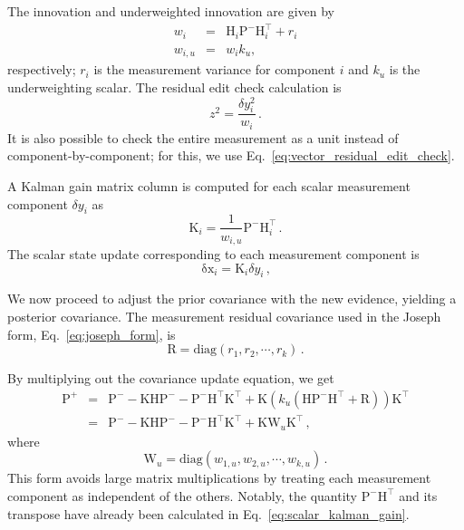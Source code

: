 \documentclass[12pt]{article}
\begin{document}
The innovation and underweighted innovation are given by
\begin{eqnarray}
w_i     &=& \mathrm{H}_i \mathrm{P}^{-} \mathrm{H}_i^\top + r_i \\
w_{i,u} &=& w_i k_u\text{,}
\end{eqnarray}
respectively; $r_i$ is the measurement variance for component $i$ and $k_u$ is the underweighting scalar. The residual edit check calculation is
\begin{equation}
z^2 = \frac{\delta y_i^2}{w_i}\,\text{.}
\end{equation}
It is also possible to check the entire measurement as a unit instead of component-by-component; for this, we use Eq.~\ref{eq:vector_residual_edit_check}.

A Kalman gain matrix column is computed for each scalar measurement component $\delta y_i$ as
\begin{equation}
\mathrm{K}_i = \frac{1}{w_{i,u}} \mathrm{P}^{-}\mathrm{H}_i^\top\,\text{.}\label{eq:scalar_kalman_gain}
\end{equation}
The scalar state update corresponding to each measurement component is
\begin{equation}
\mathrm{\delta x}_i = \mathrm{K}_i \delta y_i\,\text{,}
\end{equation}

We now proceed to adjust the prior covariance with the new evidence, yielding a posterior covariance. The measurement residual covariance used in the Joseph form, Eq.~\ref{eq:joseph_form}, is
\begin{equation}
\mathrm{R} = \text{diag}(r_1, r_2, \cdots, r_k)\,\text{.}
\end{equation}

By multiplying out the covariance update equation, we get
\begin{eqnarray*}
\mathrm{P}^{+} &=& \mathrm{P}^{-} - \mathrm{K}\mathrm{H}\mathrm{P}^{-} - \mathrm{P}^{-}\mathrm{H}^\top\mathrm{K}^\top + \mathrm{K} \left( k_u (\mathrm{H}\mathrm{P}^{-}\mathrm{H}^\top + \mathrm{R})\right)\mathrm{K}^\top \\
 &=& \mathrm{P}^{-} - \mathrm{K}\mathrm{H}\mathrm{P}^{-} - \mathrm{P}^{-}\mathrm{H}^\top\mathrm{K}^\top + \mathrm{K}\mathrm{W}_u\mathrm{K}^\top\,\textrm{,}
\end{eqnarray*}
where
\begin{equation}
\mathrm{W}_u = \text{diag}(w_{1,u}, w_{2,u}, \cdots, w_{k,u})\,\text{.}
\end{equation}
This form avoids large matrix multiplications by treating each measurement component as independent of the others. Notably, the quantity $\mathrm{P^{-}H^\top}$ and its transpose have already been calculated in Eq.~\ref{eq:scalar_kalman_gain}.
\end{document}
